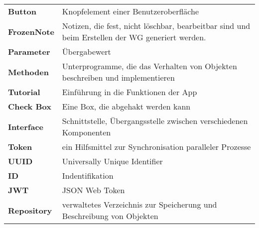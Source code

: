 \begin{table}[h!]
\begin{tabular}{p{4cm}p{10cm}}
				\textbf{Button} & Knopfelement einer Benutzeroberfläche\\
				\textbf{FrozenNote} & Notizen, die fest, nicht löschbar, bearbeitbar sind und beim Erstellen der WG generiert werden.   \\
				\textbf{Parameter} & Übergabewert  \\
				\textbf{Methoden} & Unterprogramme, die das Verhalten von Objekten beschreiben und implementieren  \\
				\textbf{Tutorial} &  Einführung in die Funktionen der App
   \\
				\textbf{Check Box} &  Eine Box, die abgehakt werden kann \\
				\textbf{Interface} & Schnittstelle, Übergangsstelle zwischen verschiedenen Komponenten  \\
				\textbf{Token} & ein Hilfsmittel zur Synchronisation paralleler Prozesse  \\
				\textbf{UUID} & Universally Unique Identifier   \\	
				\textbf{ID} &  Indentifikation \\	
				\textbf{JWT} &  JSON Web Token \\	
				\textbf{Repository} &  verwaltetes Verzeichnis zur Speicherung und Beschreibung von Objekten \\				
			\end{tabular}
		\end{table}